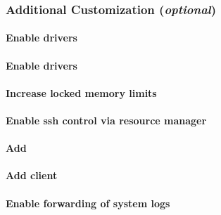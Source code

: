 \documentclass[letterpaper]{article}
\begin{document}

\subsubsection{Additional Customization ({\em optional})} \label{sec:addl_customizations}


\paragraph{Enable \InfiniBand{} drivers}


\paragraph{Enable \OmniPath{} drivers}


\paragraph{Increase locked memory limits}
 

\paragraph{Enable ssh control via resource manager} 


\vspace*{0.5cm}
\paragraph{Add \beegfs{}} \label{sec:add_beegfs}


\paragraph{Add \Lustre{} client} \label{sec:lustre_client}




\paragraph{Enable forwarding of system logs} \label{sec:add_syslog}

\end{document}
